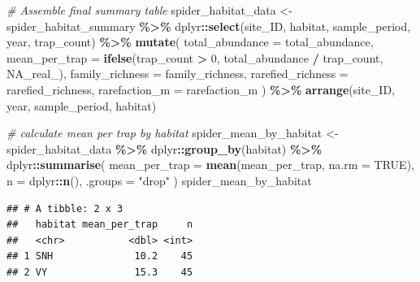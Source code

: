 \documentclass[
]{article}
\newenvironment{Shaded}{\begin{snugshade}}{\end{snugshade}}
\newcommand{\AttributeTok}[1]{\textcolor[rgb]{0.13,0.29,0.53}{#1}}
\newcommand{\CommentTok}[1]{\textcolor[rgb]{0.56,0.35,0.01}{\textit{#1}}}
\newcommand{\ConstantTok}[1]{\textcolor[rgb]{0.56,0.35,0.01}{#1}}
\newcommand{\DecValTok}[1]{\textcolor[rgb]{0.00,0.00,0.81}{#1}}
\newcommand{\FunctionTok}[1]{\textcolor[rgb]{0.13,0.29,0.53}{\textbf{#1}}}
\newcommand{\NormalTok}[1]{#1}
\newcommand{\OtherTok}[1]{\textcolor[rgb]{0.56,0.35,0.01}{#1}}
\newcommand{\SpecialCharTok}[1]{\textcolor[rgb]{0.81,0.36,0.00}{\textbf{#1}}}
\newcommand{\StringTok}[1]{\textcolor[rgb]{0.31,0.60,0.02}{#1}}
\begin{document}
\begin{Shaded}
\begin{Highlighting}[]
\CommentTok{\# Assemble final summary table}
\NormalTok{spider\_habitat\_data }\OtherTok{\textless{}{-}}\NormalTok{ spider\_habitat\_summary }\SpecialCharTok{\%\textgreater{}\%}
\NormalTok{  dplyr}\SpecialCharTok{::}\FunctionTok{select}\NormalTok{(site\_ID, habitat, sample\_period, year, trap\_count) }\SpecialCharTok{\%\textgreater{}\%}
  \FunctionTok{mutate}\NormalTok{(}
    \AttributeTok{total\_abundance   =}\NormalTok{ total\_abundance,}
    \AttributeTok{mean\_per\_trap     =} \FunctionTok{ifelse}\NormalTok{(trap\_count }\SpecialCharTok{\textgreater{}} \DecValTok{0}\NormalTok{, total\_abundance }\SpecialCharTok{/}\NormalTok{ trap\_count, }\ConstantTok{NA\_real\_}\NormalTok{),}
    \AttributeTok{family\_richness  =}\NormalTok{ family\_richness,}
    \AttributeTok{rarefied\_richness =}\NormalTok{ rarefied\_richness,}
    \AttributeTok{rarefaction\_m     =}\NormalTok{ rarefaction\_m}
\NormalTok{  ) }\SpecialCharTok{\%\textgreater{}\%}
  \FunctionTok{arrange}\NormalTok{(site\_ID, year, sample\_period, habitat)}

\CommentTok{\# calculate mean per trap by habitat}
\NormalTok{spider\_mean\_by\_habitat }\OtherTok{\textless{}{-}}\NormalTok{ spider\_habitat\_data }\SpecialCharTok{\%\textgreater{}\%}
\NormalTok{  dplyr}\SpecialCharTok{::}\FunctionTok{group\_by}\NormalTok{(habitat) }\SpecialCharTok{\%\textgreater{}\%}
\NormalTok{  dplyr}\SpecialCharTok{::}\FunctionTok{summarise}\NormalTok{(}
    \AttributeTok{mean\_per\_trap =} \FunctionTok{mean}\NormalTok{(mean\_per\_trap, }\AttributeTok{na.rm =} \ConstantTok{TRUE}\NormalTok{),}
    \AttributeTok{n             =}\NormalTok{ dplyr}\SpecialCharTok{::}\FunctionTok{n}\NormalTok{(),}
    \AttributeTok{.groups =} \StringTok{"drop"}
\NormalTok{  )}
\NormalTok{spider\_mean\_by\_habitat}
\end{Highlighting}
\end{Shaded}

\begin{verbatim}
## # A tibble: 2 x 3
##   habitat mean_per_trap     n
##   <chr>           <dbl> <int>
## 1 SNH              10.2    45
## 2 VY               15.3    45
\end{verbatim}
\end{document}
